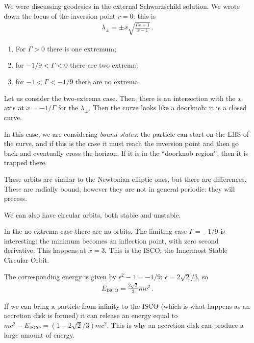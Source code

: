 \documentclass[main.tex]{subfiles}
\begin{document}


We were discussing geodesics in the external Schwarzschild solution. 
We wrote down the locus of the inversion point \(\dot{r} = 0\): this is 
%
\begin{align}
\lambda_{\pm} = \pm x \sqrt{\frac{\Gamma x + 1}{x-1}}
\,.
\end{align}

\begin{enumerate}
    \item For \(\Gamma > 0\) there is one extremum;
    \item for \(- 1/9 < \Gamma < 0\) there are two extrema;
    \item for \(-1 < \Gamma < - 1/9\) there are no extrema. 
\end{enumerate}

Let us consider the two-extrema case. Then, there is an intersection with the \(x\) axis at \(x = - 1/ \Gamma \) for the \(\lambda_{\pm }\). 
Then the curve looks like a doorknob: it is a closed curve. 

In this case, we are considering \emph{bound states}: the particle can start on the LHS of the curve, and if this is the case it must reach the inversion point and then go back and eventually cross the horizon.
If it is in the ``doorknob region'', then it is trapped there. 

These orbits are similar to the Newtonian elliptic ones, but there are differences. These are radially bound, however they are not in general periodic: they will precess.

We can also have circular orbits, both stable and unstable. 

In the no-extrema case there are no orbits. The limiting case \(\Gamma = - 1/9\) is interesting: the minimum becomes an inflection point, with zero second derivative.  
This happens at \(x = 3\). 
This is the ISCO: the Innermost Stable Circular Orbit.

The corresponding energy is given by \(\epsilon^2 - 1 = - 1/9\): \(\epsilon = 2 \sqrt{2}  /3\), so 
%
\begin{align}
E _{\text{ISCO}} = \frac{2 \sqrt{2}}{3} mc^2
\,.
\end{align}

If we can bring a particle from infinity to the ISCO (which is what happens as an accretion disk is formed) it can release an energy equal to \(mc^2 - E _{\text{ISCO}} = (1 - 2 \sqrt{2} / 3) m c^2\). This is why an accretion disk can produce a large amount of energy. 
\end{document}
